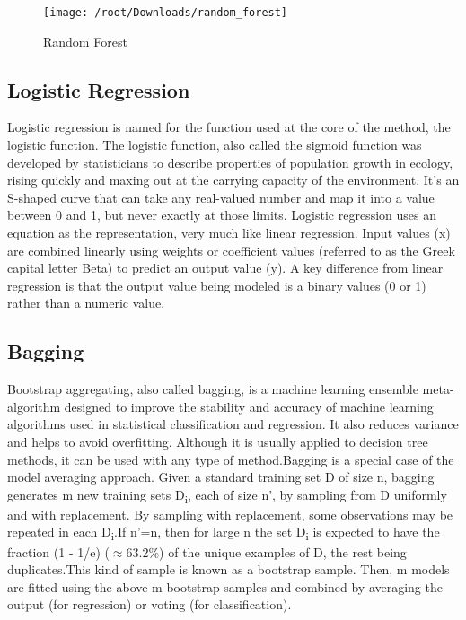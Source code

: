 \documentclass[12pt,a4paper]{report}
\begin{document}
\begin{figure}[h]
	\centering
	\texttt{[image: /root/Downloads/random\_forest]}\\
	\caption{Random Forest\cite{ref4}}
\end{figure}


\subsection{Logistic Regression}
\justifying
Logistic regression is named for the function used at the core of the method, the logistic function.
The logistic function, also called the sigmoid function was developed by statisticians to describe properties of population growth in ecology, rising quickly and maxing out at the carrying capacity of the environment. It's an S-shaped curve that can take any real-valued number and map it into a value between 0 and 1, but never exactly at those limits.
Logistic regression uses an equation as the representation, very much like linear regression.
Input values (x) are combined linearly using weights or coefficient values (referred to as the Greek capital letter Beta) to predict an output value (y). A key difference from linear regression is that the output value being modeled is a binary values (0 or 1) rather than a numeric value.\cite{ref1}

\subsection{Bagging}
\justifying
Bootstrap aggregating, also called bagging, is a machine learning ensemble meta-algorithm designed to improve the stability and accuracy of machine learning algorithms used in statistical classification and regression. It also reduces variance and helps to avoid overfitting. Although it is usually applied to decision tree methods, it can be used with any type of method.Bagging is a special case of the model averaging approach. 
Given a standard training set D of size n, bagging generates m new training sets D\textsubscript{i}, each of size n', by sampling from D uniformly and with replacement. By sampling with replacement, some observations may be repeated in each D\textsubscript{i}.If n'=n, then for large n the set D\textsubscript{i} is expected to have the fraction (1 - 1/e) ($\approx$63.2\%) of the unique examples of D, the rest being duplicates.This kind of sample is known as a bootstrap sample. Then, m models are fitted using the above m bootstrap samples and combined by averaging the output (for regression) or voting (for classification).\cite{ref2}
\end{document}
